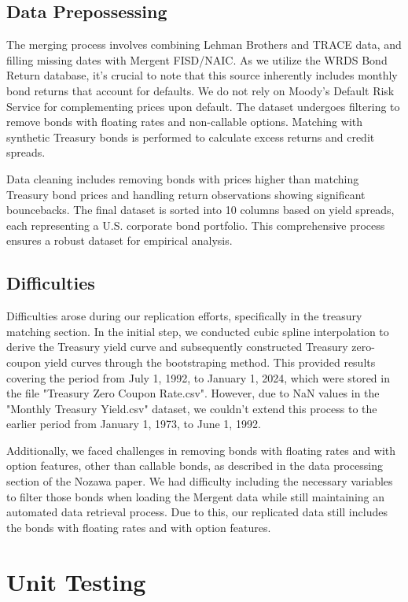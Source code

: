 \documentclass{article}
\begin{document}
\subsection{Data Prepossessing}

The merging process involves combining Lehman Brothers and TRACE data, and filling missing dates with Mergent FISD/NAIC.  As we utilize the WRDS Bond Return database, it's crucial to note that this source inherently includes monthly bond returns that account for defaults. We do not rely on Moody's Default Risk Service for complementing prices upon default. The dataset undergoes filtering to remove bonds with floating rates and non-callable options. Matching with synthetic Treasury bonds is performed to calculate excess returns and credit spreads. 

Data cleaning includes removing bonds with prices higher than matching Treasury bond prices and handling return observations showing significant bouncebacks. The final dataset is sorted into 10 columns based on yield spreads, each representing a U.S. corporate bond portfolio. This comprehensive process ensures a robust dataset for empirical analysis. 

\subsection{Difficulties}

Difficulties arose during our replication efforts, specifically in the treasury matching section. In the initial step, we conducted cubic spline interpolation to derive the Treasury yield curve and subsequently constructed Treasury zero-coupon yield curves through the bootstraping method. This provided results covering the period from July 1, 1992, to January 1, 2024, which were stored in the file "Treasury Zero Coupon Rate.csv". However, due to NaN values in the "Monthly Treasury Yield.csv" dataset, we couldn't extend this process to the earlier period from January 1, 1973, to June 1, 1992. 

Additionally, we faced challenges in removing bonds with floating rates and with option features, other than callable bonds, as described in the data processing section of the Nozawa paper. We had difficulty including the necessary variables to filter those bonds when loading the Mergent data while still maintaining an automated data retrieval process. Due to this, our replicated data still includes the bonds with floating rates and with option features. 

\section{ Unit Testing}
\end{document}
